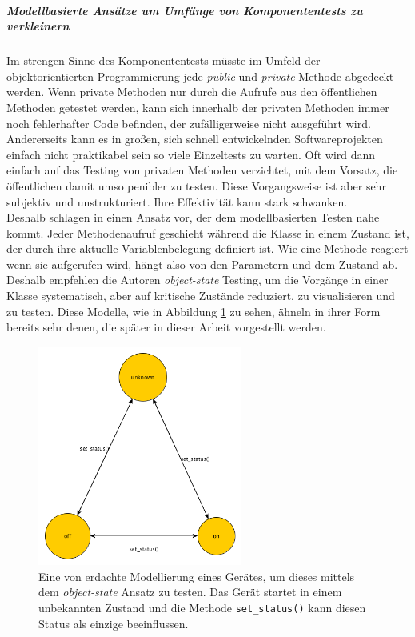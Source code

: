 \subparagraph{Modellbasierte Ansätze um Umfänge von Komponententests zu verkleinern}
Im strengen Sinne des Komponententests müsste im Umfeld der objektorientierten Programmierung jede \textit{public} und \textit{private} Methode abgedeckt werden. Wenn private Methoden nur durch die Aufrufe aus den öffentlichen Methoden getestet werden, kann sich innerhalb der privaten Methoden immer noch fehlerhafter Code befinden, der zufälligerweise nicht ausgeführt wird. Andererseits kann es in großen, sich schnell entwickelnden Softwareprojekten einfach nicht praktikabel sein so viele Einzeltests zu warten. Oft wird dann einfach auf das Testing von privaten Methoden verzichtet, mit dem Vorsatz, die öffentlichen damit umso penibler zu testen. Diese Vorgangsweise ist aber sehr subjektiv und unstrukturiert. Ihre Effektivität kann stark schwanken.\\
Deshalb schlagen \citeauthor{linz_testing_2014} in \cite{linz_testing_2014} einen Ansatz vor, der dem modellbasierten Testen nahe kommt. Jeder Methodenaufruf geschieht während die Klasse in einem Zustand ist, der durch ihre aktuelle Variablenbelegung definiert ist. Wie eine Methode reagiert wenn sie aufgerufen wird, hängt also von den Parametern und dem Zustand ab. Deshalb empfehlen die Autoren \textit{object-state} Testing, um die Vorgänge in einer Klasse systematisch, aber auf kritische Zustände reduziert, zu visualisieren und zu testen. Diese Modelle, wie in Abbildung \ref{fig:mbt_unit} zu sehen, ähneln in ihrer Form bereits sehr denen, die später in dieser Arbeit vorgestellt werden.

\begin{figure}[h] 
  \centering
     \includegraphics[width=0.6\textwidth]{figures/mbt_unit.png}
  \caption{Eine von \citeauthor{linz_testing_2014} erdachte Modellierung eines Gerätes, um dieses mittels dem \textit{object-state} Ansatz zu testen. Das Gerät startet in einem unbekannten Zustand und die Methode \texttt{set\_status()} kann diesen Status als einzige beeinflussen.}
  \label{fig:mbt_unit}
\end{figure}

